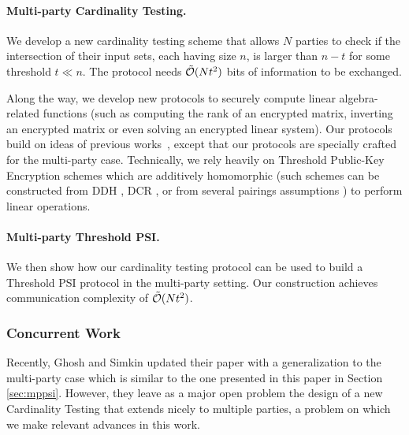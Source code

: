 \paragraph{Multi-party Cardinality Testing.} We develop a new cardinality testing scheme that allows $N$ parties to check if the intersection of their input sets, each having size $n$, is larger than $n-t$ for some threshold $t\ll n$. The protocol needs $\tilde {\mathcal{O}}(Nt^2)$ bits of information to be exchanged.

Along the way, we develop new protocols to securely compute linear algebra-related functions (such as computing the rank of an encrypted matrix, inverting an encrypted matrix or even solving an encrypted linear system). Our protocols build on ideas of previous works~\cite{TCC:NisWei06,TCC:KMWF07}, except that our protocols are specially crafted for the multi-party case. Technically, we rely heavily on Threshold Public-Key Encryption schemes which are additively homomorphic (such schemes can be constructed from DDH \cite{IEEETIT:Elgamal85}, DCR \cite{EC:Paillier99}, or from several pairings assumptions \cite{C:BonBoySha04,TCC:BonGohNis05}) to perform linear operations.


\paragraph{Multi-party Threshold PSI.} 
We then show how our cardinality testing protocol can be used to build a Threshold PSI protocol in the multi-party setting. Our construction achieves communication complexity of $\tilde{\mathcal{O}}(Nt^2)$.

\subsubsection{Concurrent Work}
Recently, Ghosh and Simkin \cite{EPRINT:GhoSim19} updated their paper with a generalization to the multi-party case which is similar to the one presented in this paper in Section \ref{sec:mppsi}. However, they leave as a major open problem the design of a new Cardinality Testing that extends nicely to multiple parties, a problem on which we make relevant advances in this work.

